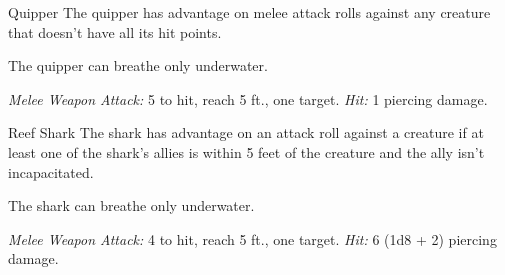 \documentclass[10pt,a4paper,twoside,bg=print,twocolumn,openany,nodeprecatedcode]{dndbook}
\begin{document}
\begin{DndMonster}[float=t]{Quipper}
\DndMonsterBasics[
armor-class = {13},
hit-points = {\DndDice{1d4 - 1}},
speed = {0 ft., swim 40 ft.}
]
\DndMonsterAbilityScores[
 str = 2,
 dex = 16,
 con = 9,
 int = 1,
 wis = 7,
 cha = 2
]
\DndMonsterDetails[
senses = {darkvision 60 ft., passive perception 8},
challenge = 0,
]
The quipper has advantage on melee attack rolls against any creature that doesn't have all its hit points.

The quipper can breathe only underwater.

\textsl{Melee Weapon Attack:} 5 to hit, reach 5 ft., one target. \textsl{Hit:} 1 piercing damage.

\end{DndMonster}



\begin{DndMonster}[float=t]{Reef Shark}
\DndMonsterBasics[
armor-class = {12 (natural armor)},
hit-points = {\DndDice{4d8 + 4}},
speed = {0 ft., swim 40 ft.}
]
\DndMonsterAbilityScores[
 str = 14,
 dex = 13,
 con = 13,
 int = 1,
 wis = 10,
 cha = 4
]
\DndMonsterDetails[
skills = {Perception +2},
senses = {blindsight 30 ft., passive perception 12},
challenge = 1/2,
]
The shark has advantage on an attack roll against a creature if at least one of the shark's allies is within 5 feet of the creature and the ally isn't incapacitated.

The shark can breathe only underwater.

\textsl{Melee Weapon Attack:} 4 to hit, reach 5 ft., one target. \textsl{Hit:} 6 (1d8 + 2) piercing damage.

\end{DndMonster}
\end{document}
